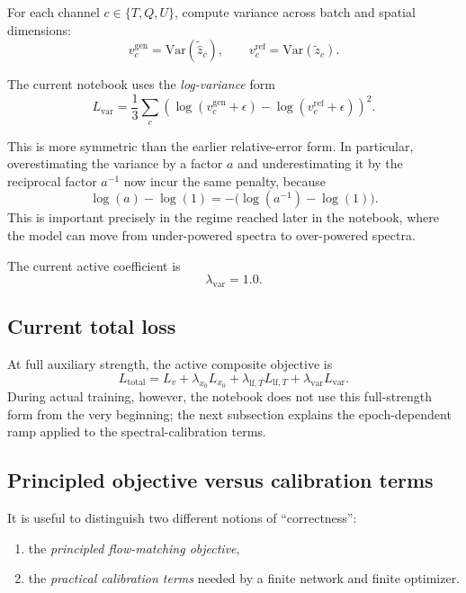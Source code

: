 \documentclass[11pt]{article}
\newcommand{\Var}{\mathrm{Var}}
\begin{document}
For each channel \(c\in\{T,Q,U\}\), compute variance across batch and spatial dimensions:
\begin{equation}
  v_c^{\mathrm{gen}} = \Var(\widetilde{\hat z}_c),
  \qquad
  v_c^{\mathrm{ref}} = \Var(\tilde z_c).
\end{equation}

The current notebook uses the \emph{log-variance} form
\begin{equation}
  L_{\mathrm{var}}
  =
  \frac13 \sum_c
  \left(
    \log(v_c^{\mathrm{gen}}+\epsilon)
    -
    \log(v_c^{\mathrm{ref}}+\epsilon)
  \right)^2.
\end{equation}

This is more symmetric than the earlier relative-error form. In particular, overestimating the variance by a factor \(a\) and underestimating it by the reciprocal factor \(a^{-1}\) now incur the same penalty, because
\begin{equation}
  \log(a) - \log(1) = -\bigl(\log(a^{-1}) - \log(1)\bigr).
\end{equation}
This is important precisely in the regime reached later in the notebook, where the model can move from under-powered spectra to over-powered spectra.

The current active coefficient is
\begin{equation}
  \lambda_{\mathrm{var}} = 1.0.
\end{equation}

\subsection{Current total loss}

At full auxiliary strength, the active composite objective is
\begin{equation}
  L_{\mathrm{total}}
  =
  L_v
  + \lambda_{x_0}L_{x_0}
  + \lambda_{\mathrm{lf},T}L_{\mathrm{lf},T}
  + \lambda_{\mathrm{var}}L_{\mathrm{var}}.
\end{equation}
During actual training, however, the notebook does not use this full-strength form from the very beginning; the next subsection explains the epoch-dependent ramp applied to the spectral-calibration terms.

\subsection{Principled objective versus calibration terms}

It is useful to distinguish two different notions of ``correctness'':
\begin{enumerate}[leftmargin=1.5em]
  \item the \emph{principled flow-matching objective},
  \item the \emph{practical calibration terms} needed by a finite network and finite optimizer.
\end{enumerate}
\end{document}

